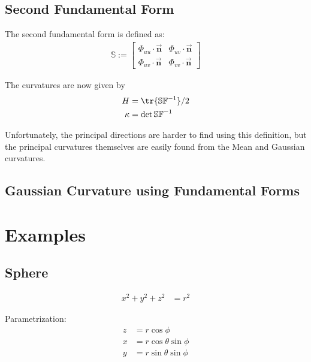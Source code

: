   \subsection{Second Fundamental Form}
  The second fundamental form is defined as:
  \begin{align}
    \mathbb{S} :=
    \begin{bmatrix}
      \Phi_{uu} \cdot \vec{\mathbf{n}} & \Phi_{uv} \cdot \vec{\mathbf{n}} \\
      \Phi_{uv} \cdot \vec{\mathbf{n}} & \Phi_{vv} \cdot \vec{\mathbf{n}}
    \end{bmatrix}
  \end{align}

  The curvatures are now given by
  \begin{align}
    H &= \tr{\mathbb{S} \mathbb{F}^{-1}}/2 \\
    \kappa &= \det{\mathbb{S} \mathbb{F}^{-1}}
  \end{align}

Unfortunately, the principal directions are harder to find using this definition, but the principal curvatures themselves are easily found from the Mean and Gaussian curvatures.

\subsection{Gaussian Curvature using Fundamental Forms}









\iffalse
\section{Examples}

\subsection{Sphere}
    \begin{align}
      x^2 + y^2 + z^2 &= r^2
    \end{align}

  Parametrization:
  \begin{align}
    z &= r \cos \phi\\
    x &= r \cos \theta \sin \phi\\
    y &= r \sin \theta \sin \phi
  \end{align}

